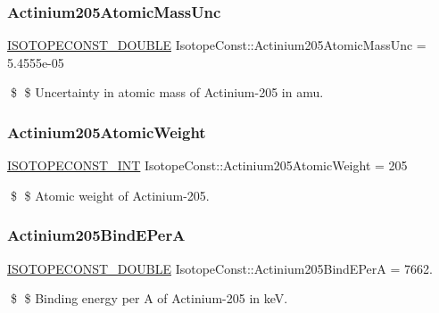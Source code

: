 \subsubsection{\texorpdfstring{Actinium205\+Atomic\+Mass\+Unc}{Actinium205AtomicMassUnc}}
{\footnotesize\ttfamily \mbox{\hyperlink{group___isotope_const-_macros_ga8f45a7272ce02c0b4c65c44636ed719a}{I\+S\+O\+T\+O\+P\+E\+C\+O\+N\+S\+T\+\_\+\+D\+O\+U\+B\+LE}} Isotope\+Const\+::\+Actinium205\+Atomic\+Mass\+Unc = 5.\+4555e-\/05}

\$ \$ Uncertainty in atomic mass of Actinium-\/205 in amu. \mbox{\label{group___isotope_const-_actinium-_ac205_ga76f747606c4381026b09144a704429ac}} 
\subsubsection{\texorpdfstring{Actinium205\+Atomic\+Weight}{Actinium205AtomicWeight}}
{\footnotesize\ttfamily \mbox{\hyperlink{group___isotope_const-_macros_ga5f18360b3e99483a35c32d789e62621c}{I\+S\+O\+T\+O\+P\+E\+C\+O\+N\+S\+T\+\_\+\+I\+NT}} Isotope\+Const\+::\+Actinium205\+Atomic\+Weight = 205}

\$ \$ Atomic weight of Actinium-\/205. \mbox{\label{group___isotope_const-_actinium-_ac205_gacfca3d78bf9fd2da7a921c4a5985a008}} 
\subsubsection{\texorpdfstring{Actinium205\+Bind\+E\+PerA}{Actinium205BindEPerA}}
{\footnotesize\ttfamily \mbox{\hyperlink{group___isotope_const-_macros_ga8f45a7272ce02c0b4c65c44636ed719a}{I\+S\+O\+T\+O\+P\+E\+C\+O\+N\+S\+T\+\_\+\+D\+O\+U\+B\+LE}} Isotope\+Const\+::\+Actinium205\+Bind\+E\+PerA = 7662.}

\$ \$ Binding energy per A of Actinium-\/205 in keV. \mbox{\label{group___isotope_const-_actinium-_ac205_gab2e530659efd4a8da948356fc85b9e70}} 
